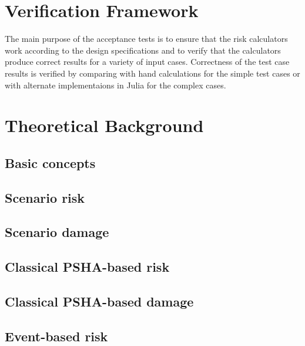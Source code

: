 \section{Verification Framework}
The main purpose of the acceptance tests is to ensure that the risk calculators work according to the design specifications and to verify that the calculators produce correct results for a variety of input cases. Correctness of the test case results is verified by comparing with hand calculations for the simple test cases or with alternate implementaions in Julia for the complex cases.

\section{Theoretical Background}
\subsection{Basic concepts}
   \label{subsec:theory-basic-concepts}
   
\subsection{Scenario risk}
   \label{subsec:theory-sr}
   
\subsection{Scenario damage}
   \label{subsec:theory-sd}
   
\subsection{Classical PSHA-based risk}
   \label{subsec:theory-cr}
   
\subsection{Classical PSHA-based damage}
   \label{subsec:theory-cd}
   
\subsection{Event-based risk}
   \label{subsec:theory-ebr}
   
   \cleardoublepage